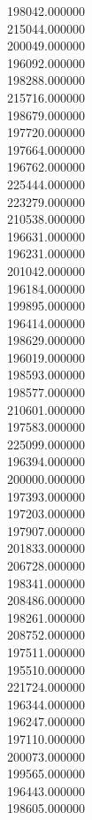 198042.000000\\
215044.000000\\
200049.000000\\
196092.000000\\
198288.000000\\
215716.000000\\
198679.000000\\
197720.000000\\
197664.000000\\
196762.000000\\
225444.000000\\
223279.000000\\
210538.000000\\
196631.000000\\
196231.000000\\
201042.000000\\
196184.000000\\
199895.000000\\
196414.000000\\
198629.000000\\
196019.000000\\
198593.000000\\
198577.000000\\
210601.000000\\
197583.000000\\
225099.000000\\
196394.000000\\
200000.000000\\
197393.000000\\
197203.000000\\
197907.000000\\
201833.000000\\
206728.000000\\
198341.000000\\
208486.000000\\
198261.000000\\
208752.000000\\
197511.000000\\
195510.000000\\
221724.000000\\
196344.000000\\
196247.000000\\
197110.000000\\
200073.000000\\
199565.000000\\
196443.000000\\
198605.000000\\
